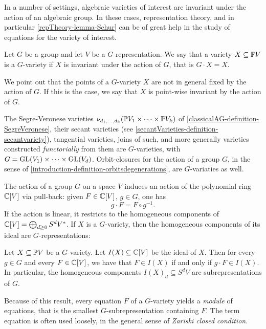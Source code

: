 In a number of settings, algebraic varieties of interest are invariant under the action of an algebraic group. In these cases, representation theory, and in particular \ref{repTheory-lemma-Schur} can be of great help in the study of equations for the variety of interest.

\begin{definition}
 \label{repTheory-definition-Gvariety}
 Let $G$ be a group and let $V$ be a $G$-representation. We say that a variety $X \subseteq \mathbb{P} V$ is a $G$-variety if $X$ is invariant under the action of $G$, that is $G \cdot X = X$. 
\end{definition}
We point out that the points of a $G$-variety $X$ are not in general fixed by the action of $G$. If this is the case, we say that $X$ is point-wise invariant by the action of $G$.

The Segre-Veronese varieties $\nu_{d_1 , \ldots , d_k} ( \mathbb{P} V_1 \times \cdots \times \mathbb{P} V_k)$ of \ref{classicalAG-definition-SegreVeronese}, their secant varieties (see \ref{secantVarieties-definition-secantvariety}), tangential varieties, joins of such, and more generally varieties constructed \emph{functorially} from them are $G$-varieties, with $G = \mathrm{GL}(V_1) \times \cdots \times \mathrm{GL}(V_d)$. Orbit-closures for the action of a group $G$, in the sense of \ref{introduction-definition-orbitsdegenerations}, are $G$-variaties as well.

The action of a group $G$ on a space $V$ induces an action of the polynomial ring $\mathbb{C}[V]$ via pull-back: given $F \in \mathbb{C}[V]$, $g \in G$, one has 
\[
g \cdot F = F \circ g^{-1}.
\]
If the action is linear, it restricts to the homogeneous components of $\mathbb{C}[V] = \bigoplus_{d \geq 0} S^d V^*$. If $X$ is a $G$-variety, then the homogeneous components of its ideal are $G$-representations:
\begin{lemma}
\label{repTheory-lemma-GactionOnIdeal}
 Let $X \subseteq \mathbb{P} V$ be a $G$-variety. Let $I(X) \subseteq \mathbb{C}[V]$ be the ideal of $X$. Then for every $g \in G$ and every $F \in \mathbb{C}[V]$, we have that $F \in I(X)$ if and only if $g \cdot F \in I(X)$. In particular, the homogeneous components $I(X)_d \subseteq  S^d V$ are subrepresentations of $G$.
\end{lemma}
Because of this result, every equation $F$ of a $G$-variety yields a \emph{module} of equations, that is the smallest $G$-subrepresentation containing $F$. The term equation is often used loosely, in the general sense of \emph{Zariski closed condition}.

